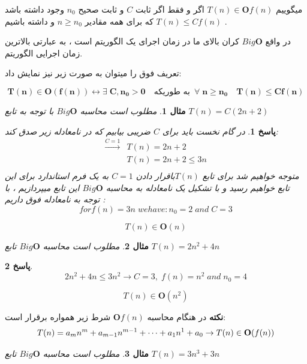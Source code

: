 \documentclass[12pt]{article}
\newtheorem{question}{مثال}[section]
\newtheorem{answer}{پاسخ}[section]
\newcommand{\func}{$T(n)$}
\begin{document}
میگوییم $T(n) \in \mathbf{O}f(n) $ اگر و فقط اگر ثابت $C$ و ثابت صحیح $n_0$ وجود داشته باشد که برای همه مقادیر $n \ge n_0$  و داشته باشیم $T(n) \le Cf(n)$ . 

در واقع $Big \mathbf{O}$ کران بالای ما در زمان اجرای یک الگوریتم است ، به عبارتی بالاترین زمان اجرایی الگوریتم.

تعریف فوق را میتوان به صورت زیر نیز نمایش داد:

\[
\mathbf{T(n) \in \mathbf{O}(f(n)) \leftrightarrow \exists \; C,n_0 > 0
\quad \text{به طوریکه} \;\ \forall \; n \ge n_0 \quad T(n) \le Cf(n)}
\]

\begin{question}
 مطلوب است محاسبه $Big \mathbf{O}$  با توجه به تابع $T(n) = C(2n+2)$ 
\end{question}

\begin{answer}
در گام نخست باید برای $C$ ضریبی بیابیم که در نامعادله زیر صدق کند:\\
\begin{align*}
\xrightarrow{C=1} & T(n) = 2n + 2 \\
& T(n) = 2n + 2 \le 3n \\
\end{align*}
متوجه خواهیم شد برای تابع \func باقرار دادن  $C=1$ به یک فرم استاندارد برای این تابع خواهیم رسید و با تشکیل یک نامعادله به محاسبه $ Big \mathbf{O}$ این تابع میپردازیم ، با توجه به نامعادله فوق داریم :
\[
for f(n) = 3n \; we have: n_0 = 2 \; and \; C = 3 
\]

\[T(n) \in \mathbf{O}(n)\]
\end{answer}


\begin{question}
مطلوب است محاسبه $Big \mathbf{O}$  تابع $T(n) = 2n^2 + 4n$  
\end{question}

\begin{answer}
\[
2n^2 + 4n \le 3n^2 \rightarrow C = 3 ,\; f(n) = n^2 \; and \; n_0 = 4
\]

\[T(n) \in \mathbf{O}(n^2)\]
\end{answer}
\newpage

\textbf{نکته}
در هنگام محاسبه $\mathbf{O}f(n)$ شرط زیر همواره برقرار است:
\[
T(n) = a_mn^m + a_{m-1}n^{m-1}+ \dots + a_1n^1+a_0\\
\rightarrow T(n) \in \mathbf{O} (f(n))
\]
\newline

\begin{question}
مطلوب است محاسبه $Big \mathbf{O}$  تابع $T(n) = 3n^3 + 3n$  
\end{question}
\end{document}
